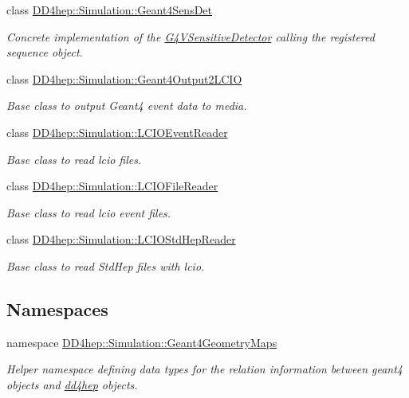 \begin{DoxyCompactItemize}
class \hyperlink{class_d_d4hep_1_1_simulation_1_1_geant4_sens_det}{DD4hep::Simulation::Geant4SensDet}
\begin{DoxyCompactList}\small\item\em Concrete implementation of the \hyperlink{class_g4_v_sensitive_detector}{G4VSensitiveDetector} calling the registered sequence object. \item\end{DoxyCompactList}\item 
class \hyperlink{class_d_d4hep_1_1_simulation_1_1_geant4_output2_l_c_i_o}{DD4hep::Simulation::Geant4Output2LCIO}
\begin{DoxyCompactList}\small\item\em Base class to output Geant4 event data to media. \item\end{DoxyCompactList}\item 
class \hyperlink{class_d_d4hep_1_1_simulation_1_1_l_c_i_o_event_reader}{DD4hep::Simulation::LCIOEventReader}
\begin{DoxyCompactList}\small\item\em Base class to read lcio files. \item\end{DoxyCompactList}\item 
class \hyperlink{class_d_d4hep_1_1_simulation_1_1_l_c_i_o_file_reader}{DD4hep::Simulation::LCIOFileReader}
\begin{DoxyCompactList}\small\item\em Base class to read lcio event files. \item\end{DoxyCompactList}\item 
class \hyperlink{class_d_d4hep_1_1_simulation_1_1_l_c_i_o_std_hep_reader}{DD4hep::Simulation::LCIOStdHepReader}
\begin{DoxyCompactList}\small\item\em Base class to read StdHep files with lcio. \item\end{DoxyCompactList}\end{DoxyCompactItemize}
\subsection*{Namespaces}
\begin{DoxyCompactItemize}
\item 
namespace \hyperlink{namespace_d_d4hep_1_1_simulation_1_1_geant4_geometry_maps}{DD4hep::Simulation::Geant4GeometryMaps}


\begin{DoxyCompactList}\small\item\em Helper namespace defining data types for the relation information between geant4 objects and \hyperlink{namespacedd4hep}{dd4hep} objects. \item\end{DoxyCompactList}\end{DoxyCompactItemize}
